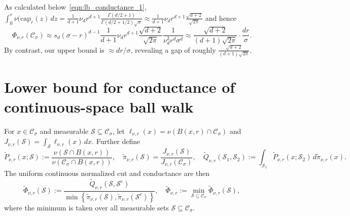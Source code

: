 \documentclass{report}
\newcommand{\set}[1]{\left\{#1\right\}}
\newcommand{\1}{\mathbf{1}}
\newcommand{\Sset}{\mathcal{S}}
\newcommand{\mc}[1]{\mathcal{#1}}
\theoremstyle{alden}
\theoremstyle{aldenthm}
\theoremstyle{definition}
\theoremstyle{remark}
\begin{document}
As calculated below~\eqref{eqn:lb_conductance_1}, $\int_{0}^{r} \nu(\mathrm{cap}_{r}(z)  \,dz = \frac{1}{d + 1} \nu_d r^{d + 1} \frac{\Gamma(d/2 + 1)}{\Gamma(d/2 + 1/2)\sqrt{\pi}} \approx \frac{1}{d + 1} \nu_d r^{d + 1} \frac{\sqrt{d + 2}}{\sqrt{2\pi}}$ and hence
\begin{equation*}
\Phi_{\nu,r}(\mc{C}_{\sigma}) \approx s_d (\sigma - r)^{d - 1}\frac{1}{d + 1} \nu_d r^{d + 1} \frac{\sqrt{d + 2}}{\sqrt{2\pi}} \frac{1}{\nu_d^2 r^d \sigma^d} \approx \frac{ \sqrt{d + 2}}{(d + 1)\sqrt{2\pi}} \cdot \frac{dr}{\sigma}.
\end{equation*}
By contrast, our upper bound is $\approx dr/\sigma$, revealing a gap of roughly $\frac{ \sqrt{d + 2}}{(d + 1)\sqrt{2\pi}}$. 

\chapter{Lower bound for conductance of continuous-space ball walk}
For $x \in \mc{C}_{\sigma}$ and measurable $\Sset \subseteq \mc{C}_{\sigma}$, let $\ell_{\nu,r}(x) = \nu(B(x,r) \cap \mc{C}_{\sigma})$ and ${J}_{\nu,r}(\mc{S}) = \int_{\mc{S}} \ell_{\nu,r}(x) \,dx$. Further define
\begin{equation*}
\widetilde{P}_{\nu,r}(x; \Sset) := \frac{\nu(\Sset \cap B(x,r))}{\nu(\mc{C}_{\sigma} \cap B(x,r))}, \quad \widetilde{\pi}_{\nu,r}(\Sset) = \frac{J_{\nu,r}(\mc{S})}{J_{\nu,r}(\mc{C}_{\sigma})}, \quad  \widetilde{Q}_{\nu,r}(\Sset_1,\Sset_2) := \int_{\Sset_1} \widetilde{P}_{\nu,r}(x;\Sset_2) \,d\widetilde{\pi}_{\nu,r}(x).
\end{equation*}
The uniform continuous normalized cut and conductance are then
\begin{equation*}
\widetilde{\Phi}_{\nu,r}(\Sset) := \frac{\widetilde{Q}_{\nu,r}(\Sset, \Sset^c)}{\min\set{\widetilde{\pi}_{\nu,r}(\Sset),\widetilde{\pi}_{\nu,r}(\Sset^c)}}, \quad \widetilde{\Phi}_{\nu,r} := \min_{\Sset \subseteq \mc{C}_{\sigma}} \widetilde{\Phi}_{\nu,r}(\Sset),
\end{equation*}
where the minimum is taken over all measurable sets $\Sset \subseteq \mc{C}_{\sigma}$.
\end{document}
